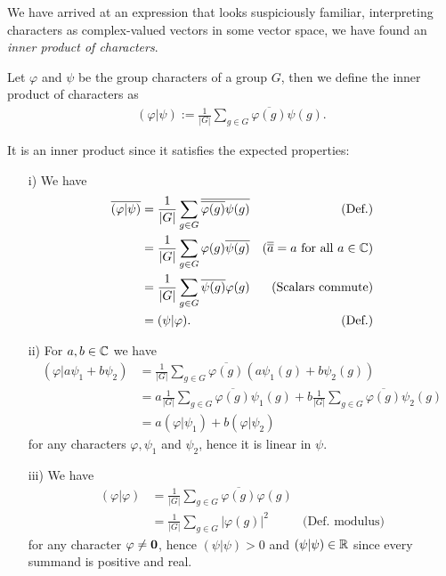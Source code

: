 We have arrived at an expression that looks suspiciously familiar, interpreting characters as complex-valued vectors in some vector space, we have found an \textit{inner product of characters}.

\begin{definition}
	Let $\varphi$ and $\psi$ be the group characters of a group $G$, then we define the inner product of characters as
	\begin{align*}
		(\varphi | \psi) := \frac{1}{|G|} \sum_{g \in G} \overline{\varphi(g)} {\psi(g)}.
	\end{align*}
\end{definition}

It is an inner product since it satisfies the expected properties:
\begin{enumerate}
	\item[i)] We have 
	\begin{align*}
		\overline{(\varphi|\psi)} &= \frac{1}{|G|} \sum_{g \in G} \overline{\overline{\varphi(g)} {\psi(g)}} & \text{(Def.)}\\
		&= \frac{1}{|G|} \sum_{g \in G} \varphi(g) \overline{\psi(g)} & \text{($\overline{\overline{a}}=a$ for all $a \in \mathbb{C}$)}\\
		&= \frac{1}{|G|} \sum_{g \in G} \overline{\psi(g)} {\varphi(g)} & \text{(Scalars commute)}\\
		&= (\psi|\varphi). &\text{(Def.)}
	\end{align*}
	\item[ii)] For $a,b \in \mathbb{C}$ we have 
	\begin{align*}
		(\varphi | a\psi_1 + b\psi_2) &= \frac{1}{|G|} \sum_{g \in G} \overline{\varphi(g)} \left({a\psi_1(g) + b\psi_2(g)}\right) \\
		&= a\frac{1}{|G|} \sum_{g \in G} \overline{\varphi(g)} {\psi_1(g)}  +b \frac{1}{|G|} \sum_{g \in G} \overline{\varphi(g)} {\psi_2(g)}  \\
		&= a(\varphi | \psi_1 )  +b (\varphi |\psi_2) 
	\end{align*}
	for any characters $\varphi, \psi_1$ and $\psi_2$, hence it is linear in $\psi$.
	\item[iii)] We have 
	\begin{align*}
		(\varphi|\varphi) &= \frac{1}{|G|} \sum_{g \in G} \overline{\varphi(g)} {\varphi(g)} \\
		&= \frac{1}{|G|} \sum_{g \in G} |\varphi(g)|^2 & \text{(Def. modulus)}
	\end{align*}
	for any character $\varphi \neq \mathbf{0}$, hence $(\psi|\psi) > 0$ and $(\psi|\psi) \in \mathbb{R}$ since every summand is positive and real.
\end{enumerate}

